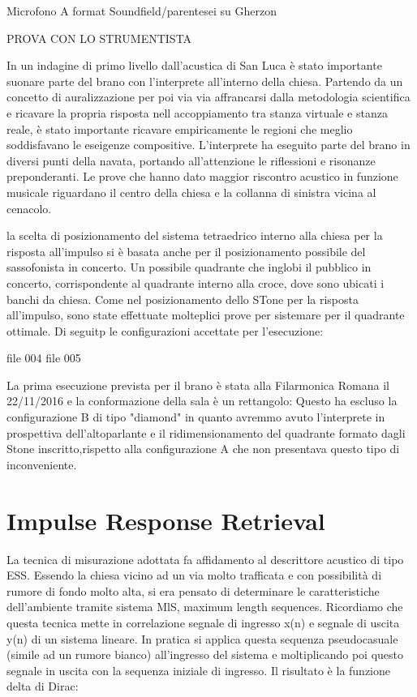 Microfono A format Soundfield/parentesei su Gherzon

PROVA CON LO STRUMENTISTA

In un indagine di primo livello dall'acustica di San Luca è stato importante suonare parte del brano con l'interprete all'interno della chiesa. Partendo da un concetto di auralizzazione per poi via via affrancarsi dalla metodologia scientifica e ricavare la propria risposta nell accoppiamento tra stanza virtuale e stanza reale, è stato importante ricavare empiricamente le regioni che meglio soddisfavano le eseigenze compositive. L'interprete ha eseguito parte del brano in diversi punti della navata, portando all'attenzione le riflessioni e risonanze preponderanti. 
Le prove che hanno dato maggior riscontro acustico in funzione musicale riguardano il centro della chiesa e la collanna di sinistra vicina al cenacolo.

la scelta di posizionamento del sistema tetraedrico interno alla chiesa per la risposta all'impulso si è basata anche per il posizionamento possibile del sassofonista in concerto.
Un possibile quadrante che inglobi il pubblico in concerto, corrispondente al quadrante interno alla croce, dove sono ubicati i banchi da chiesa.
Come nel posizionamento dello STone per la risposta all'impulso, sono state effettuate molteplici prove per sistemare per il quadrante ottimale. Di seguitp le configurazioni accettate per l'esecuzione:

file 004     file 005

La prima esecuzione prevista per il brano è stata alla Filarmonica Romana il 22/11/2016 e la conformazione della sala è un rettangolo: Questo ha escluso la configurazione B di tipo "diamond" in quanto avremmo avuto l'interprete in prospettiva dell'altoparlante e il ridimensionamento del quadrante formato dagli Stone inscritto,rispetto alla configurazione A che non presentava questo tipo di inconveniente.

\section{Impulse Response Retrieval} 

La tecnica di misurazione adottata fa affidamento al descrittore acustico di tipo ESS.
Essendo la chiesa vicino ad un via molto trafficata e con possibilità di rumore di fondo molto alta, si era pensato di determinare le caratteristiche dell'ambiente tramite sistema MlS, maximum length sequences. 
Ricordiamo che questa tecnica mette in correlazione segnale di ingresso x(n) e segnale di uscita y(n) di un sistema lineare. 
In pratica si applica questa sequenza pseudocasuale (simile ad un rumore bianco) all'ingresso del sistema e moltiplicando poi questo segnale in uscita con la sequenza iniziale di ingresso. Il risultato è la funzione delta di Dirac:

